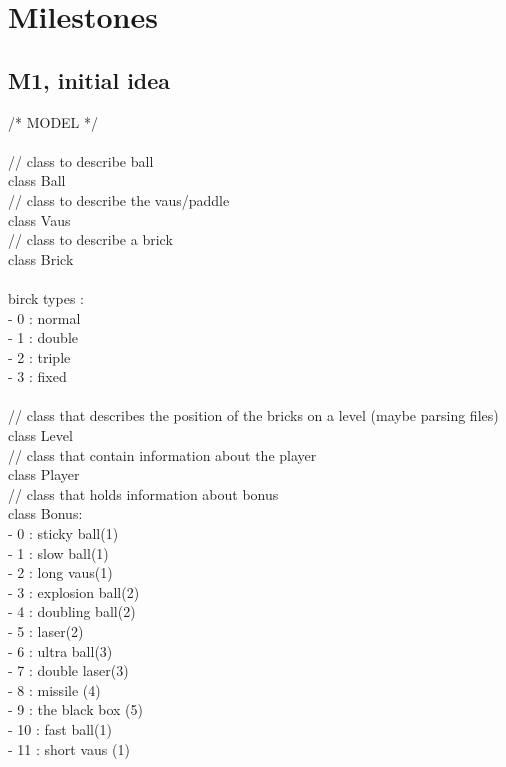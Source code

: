 \chapter*{Milestones}
\label{cha:milestones}

\section*{M1, initial idea}
\label{sec:m1}
/* MODEL */\\
\\
// class to describe ball\\
class Ball\\
// class to describe the vaus/paddle\\
class Vaus\\
// class to describe a brick\\
class Brick\\
\\
birck types :\\
 - 0 : normal\\
 - 1 : double\\
 - 2 : triple\\
 - 3 : fixed\\
\\
// class that describes the position of the bricks on a level (maybe parsing files)\\
class Level\\
// class that contain information about the player\\
class Player\\
// class that holds information about bonus\\
class Bonus:\\
 - 0 : sticky ball(1)\\
 - 1 : slow ball(1)\\
 - 2 : long vaus(1)\\
 - 3 : explosion ball(2)\\
 - 4 : doubling ball(2)\\
 - 5 : laser(2)\\
 - 6 : ultra ball(3)\\
 - 7 : double laser(3)\\
 - 8 : missile (4)\\
 - 9 : the black box (5)\\
 - 10 : fast ball(1)\\
 - 11 : short vaus (1)\\
